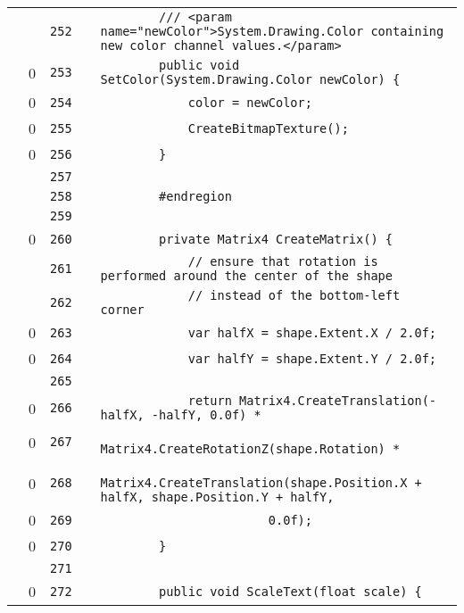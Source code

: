 \documentclass[a4paper,landscape,10pt]{article}
\begin{document}
\begin{longtable}[l]{lrrll}
\cellcolor{gray} &  & \verb~252~ & & \verb~        /// <param name="newColor">System.Drawing.Color containing new color channel values.</param>~\\
\cellcolor{red} & 0 & \verb~253~ & & \verb~        public void SetColor(System.Drawing.Color newColor) {~\\
\cellcolor{red} & 0 & \verb~254~ & & \verb~            color = newColor;~\\
\cellcolor{red} & 0 & \verb~255~ & & \verb~            CreateBitmapTexture();~\\
\cellcolor{red} & 0 & \verb~256~ & & \verb~        }~\\
\cellcolor{gray} &  & \verb~257~ & & \verb~~\\
\cellcolor{gray} &  & \verb~258~ & & \verb~        #endregion~\\
\cellcolor{gray} &  & \verb~259~ & & \verb~~\\
\cellcolor{red} & 0 & \verb~260~ & & \verb~        private Matrix4 CreateMatrix() {~\\
\cellcolor{gray} &  & \verb~261~ & & \verb~            // ensure that rotation is performed around the center of the shape~\\
\cellcolor{gray} &  & \verb~262~ & & \verb~            // instead of the bottom-left corner~\\
\cellcolor{red} & 0 & \verb~263~ & & \verb~            var halfX = shape.Extent.X / 2.0f;~\\
\cellcolor{red} & 0 & \verb~264~ & & \verb~            var halfY = shape.Extent.Y / 2.0f;~\\
\cellcolor{gray} &  & \verb~265~ & & \verb~~\\
\cellcolor{red} & 0 & \verb~266~ & & \verb~            return Matrix4.CreateTranslation(-halfX, -halfY, 0.0f) *~\\
\cellcolor{red} & 0 & \verb~267~ & & \verb~                   Matrix4.CreateRotationZ(shape.Rotation) *~\\
\cellcolor{red} & 0 & \verb~268~ & & \verb~                   Matrix4.CreateTranslation(shape.Position.X + halfX, shape.Position.Y + halfY,~\\
\cellcolor{red} & 0 & \verb~269~ & & \verb~                       0.0f);~\\
\cellcolor{red} & 0 & \verb~270~ & & \verb~        }~\\
\cellcolor{gray} &  & \verb~271~ & & \verb~~\\
\cellcolor{red} & 0 & \verb~272~ & & \verb~        public void ScaleText(float scale) {~\\

\end{longtable}
\end{document}
